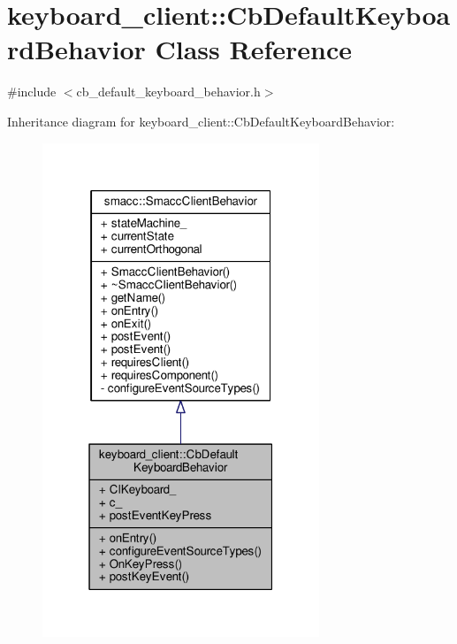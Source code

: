 \hypertarget{classkeyboard__client_1_1CbDefaultKeyboardBehavior}{}\section{keyboard\+\_\+client\+:\+:Cb\+Default\+Keyboard\+Behavior Class Reference}
\label{classkeyboard__client_1_1CbDefaultKeyboardBehavior}


{\ttfamily \#include $<$cb\+\_\+default\+\_\+keyboard\+\_\+behavior.\+h$>$}



Inheritance diagram for keyboard\+\_\+client\+:\+:Cb\+Default\+Keyboard\+Behavior\+:\nopagebreak
\begin{figure}[H]
\begin{center}
\leavevmode
\includegraphics[width=235pt]{classkeyboard__client_1_1CbDefaultKeyboardBehavior__inherit__graph}
\end{center}
\end{figure}


